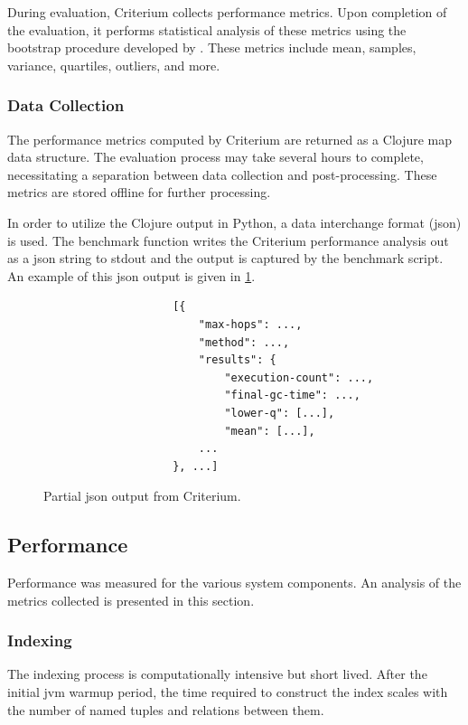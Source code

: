 			During evaluation, Criterium collects performance metrics.  Upon completion of the evaluation, it performs statistical analysis of these metrics using the bootstrap procedure developed by \citeauthor{efron-87} \cite{efron-87}.  These metrics include mean, samples, variance, quartiles, outliers, and more.
		
			\subsubsection{Data Collection}
			\label{sec:data-collection}
				The performance metrics computed by Criterium are returned as a Clojure map data structure.  The evaluation process may take several hours to complete, necessitating a separation between data collection and post-processing.  These metrics are stored offline for further processing.
				
				In order to utilize the Clojure output in Python, a data interchange format (\gls{json}) is used.  The benchmark function writes the Criterium performance analysis out as a \gls{json} string to stdout and the output is captured by the benchmark script.  An example of this \gls{json} output is given in \cref{fig:criterium-json-output}.
				
				\begin{figure}[H]
					\centering %
					\begin{verbatim}
                    [{
                        "max-hops": ...,
                        "method": ...,
                        "results": {
                            "execution-count": ...,
                            "final-gc-time": ...,
                            "lower-q": [...],
                            "mean": [...],
                        ...
                    }, ...]
					\end{verbatim}
					
					\caption{Partial \gls{json} output from Criterium.}
					\label{fig:criterium-json-output}
				\end{figure}
		
		\subsection{Performance}
		\label{sec:performance}
			Performance was measured for the various system components.  An analysis of the metrics collected is presented in this section.
			
			\subsubsection{Indexing}
				The indexing process is computationally intensive but short lived.  After the initial \gls{jvm} warmup period, the time required to construct the index scales with the number of named tuples and relations between them.
				

